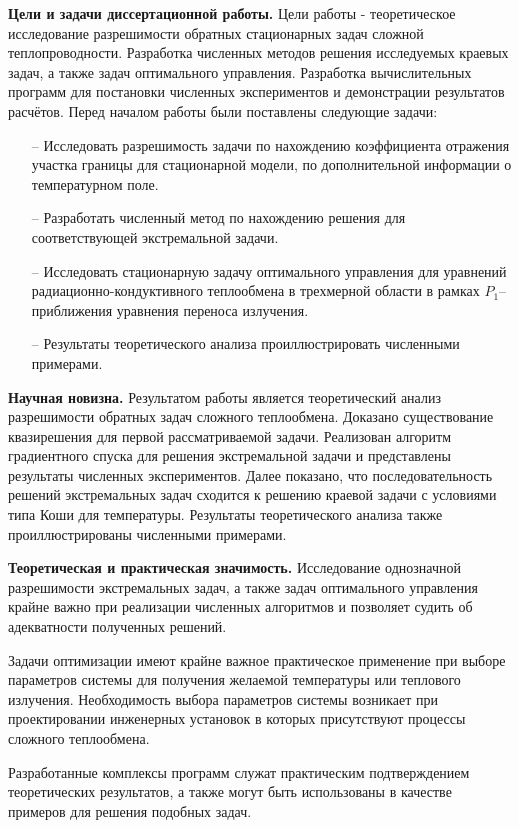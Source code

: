 \textbf{Цели и задачи диссертационной работы.}
Цели работы - теоретическое исследование разрешимости обратных стационарных задач
сложной теплопроводности.
Разработка численных методов решения исследуемых краевых задач,
а также задач оптимального управления.
Разработка вычислительных программ для постановки численных экспериментов
и демонстрации результатов расчётов.
Перед началом работы были поставлены следующие задачи:
\begin{itemize}
  \item[--] Исследовать разрешимость задачи по нахождению коэффициента отражения участка границы для
  стационарной модели, по дополнительной информации о температурном поле.
  \item[--] Разработать численный метод по нахождению решения для соответствующей экстремальной задачи.
  \item[--] Исследовать стационарную задачу оптимального управления для уравнений радиационно-кондуктивного
  теплообмена в трехмерной области в рамках $P_1$–приближения уравнения переноса излучения.
  \item[--] Результаты теоретического анализа проиллюстрировать численными примерами.
\end{itemize}


\textbf{Научная новизна.}
Результатом работы является теоретический анализ
разрешимости обратных задач сложного теплообмена.
Доказано существование квазирешения для первой рассматриваемой задачи.
Реализован алгоритм градиентного спуска для решения экстремальной задачи и представлены результаты
численных экспериментов.
Далее показано, что последовательность решений экстремальных задач сходится к решению
краевой задачи с условиями типа Коши для температуры.
Результаты теоретического анализа также проиллюстрированы численными примерами.

\textbf{Теоретическая и практическая значимость.}
Исследование однозначной разрешимости экстремальных задач, а также задач оптимального
управления крайне важно при реализации численных алгоритмов и позволяет
судить об адекватности полученных решений.

Задачи оптимизации имеют крайне важное практическое применение при выборе параметров системы для
получения желаемой температуры или теплового излучения.
Необходимость выбора параметров системы возникает при проектировании инженерных установок
в которых присутствуют процессы сложного теплообмена.

Разработанные комплексы программ служат практическим подтверждением теоретических результатов,
а также могут быть использованы в качестве примеров для решения подобных задач.



